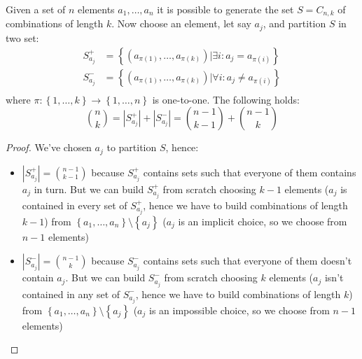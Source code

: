 Given a set of $n$ elements $a_1, \ldots,a_n$ it is possible to
generate the set $S = C_{n,k}$ of combinations of length $k$. Now choose an
element, let say $a_j$, and partition $S$ in two set:
\begin{displaymath}
  \begin{split}
    S_{a_j}^+ &= \left \lbrace (a_{\pi(1)}, \ldots, a_{\pi(k)}) |
      \exists i: a_j = a_{\pi(i)} \right\rbrace \\
    S_{a_j}^- &= \left \lbrace (a_{\pi(1)}, \ldots, a_{\pi(k)}) |
      \forall i: a_j \not = a_{\pi(i)} \right\rbrace \\
  \end{split}
\end{displaymath}
where $\pi: \left \lbrace 1, \ldots, k \right\rbrace \rightarrow \left
  \lbrace 1, \ldots, n \right\rbrace $ is one-to-one. The following
holds:
\begin{displaymath}
  {{n}\choose{k}} = \left| S_{a_j}^+ \right| + \left| S_{a_j}^-
  \right| = {{n-1}\choose{k-1}} +  {{n-1}\choose{k}}
\end{displaymath}
\begin{proof}
  We've chosen $a_j$ to partition $S$, hence:
  \begin{itemize}
  \item $\left| S_{a_j}^+ \right| = {{n-1}\choose{k-1}}$ because
    $S_{a_j}^+$ contains sets such that everyone of them contains $a_j$
    in turn. But we can build $ S_{a_j}^+$ from scratch choosing $k-1$ elements ($a_j$
    is contained in every set of $S_{a_j}^+$, hence we have to build
    combinations of length $k-1$) from $\left \lbrace a_1, \ldots, a_n
    \right\rbrace \setminus \left \lbrace a_j \right\rbrace $ ($a_j$
    is an implicit choice, so we choose from $n-1$ elements)
  \item $\left| S_{a_j}^- \right| = {{n-1}\choose{k}}$ because $
    S_{a_j}^-$ contains sets such that everyone of them doesn't contain
    $a_j$. But we can build $ S_{a_j}^- $ from scratch choosing $k$
    elements ($a_j$ isn't contained in any set of $S_{a_j}^-$, hence
    we have to build combinations of length $k$) from $\left \lbrace
      a_1, \ldots, a_n \right\rbrace \setminus \left \lbrace a_j
    \right\rbrace $ ($a_j$ is an impossible choice, so we choose from
    $n-1$ elements)
  \end{itemize}
\end{proof}

